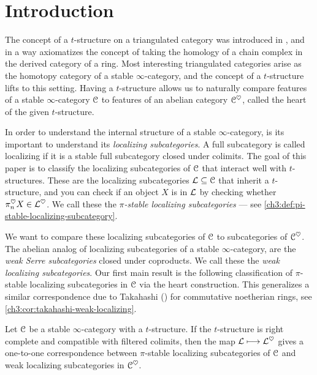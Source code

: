 

\section{Introduction}

The concept of a $t$-structure on a triangulated category was introduced in \cite{beilinson-bernstein-deligne_1983}, and in a way axiomatizes the concept of taking the homology of a chain complex in the derived category of a ring. Most interesting triangulated categories arise as the homotopy category of a stable $\infty$-category, and the concept of a $t$-structure lifts to this setting. Having a $t$-structure allows us to naturally compare features of a stable $\infty$-category $\EuScript{C}$ to features of an abelian category $\EuScript{C}^\heartsuit$, called the heart of the given $t$-structure. 

In order to understand the internal structure of a stable $\infty$-category, is its important to understand its \emph{localizing subcategories}. A full subcategory is called localizing if it is a stable full subcategory closed under colimits. The goal of this paper is to classify the localizing subcategories of $\EuScript{C}$ that interact well with $t$-structures. These are the localizing subcategories $\mathcal{L}\subseteq \EuScript{C}$ that inherit a $t$-structure, and you can check if an object $X$ is in $\mathcal{L}$ by checking whether $\pi_n^\heartsuit X\in \mathcal{L}^\heartsuit$. We call these the \emph{$\pi$-stable localizing subcategories} --- see \cref{ch3:def:pi-stable-localizing-subcategory}. 

We want to compare these localizing subcategories of $\EuScript{C}$ to subcategories of $\EuScript{C}^\heartsuit$. The abelian analog of localizing subcategories of a stable $\infty$-category, are the \emph{weak Serre subcategories} closed under coproducts. We call these the \emph{weak localizing subcategories}. Our first main result is the following classification of $\pi$-stable localizing subcategories in $\EuScript{C}$ via the heart construction. This generalizes a similar correspondence due to Takahashi (\cite{takahashi_2009}) for commutative noetherian rings, see \cref{ch3:cor:takahashi-weak-localizing}. 

\begin{introthm}
    \label{ch3:thm:A}
    Let $\EuScript{C}$ be a stable $\infty$-category with a $t$-structure. If the $t$-structure is right complete and compatible with filtered colimits, then the map $\mathcal{L}\longmapsto \mathcal{L}^\heartsuit$ gives a one-to-one correspondence between $\pi$-stable localizing subcategories of $\EuScript{C}$ and weak localizing subcategories in $\EuScript{C}^\heartsuit$.
\end{introthm}

